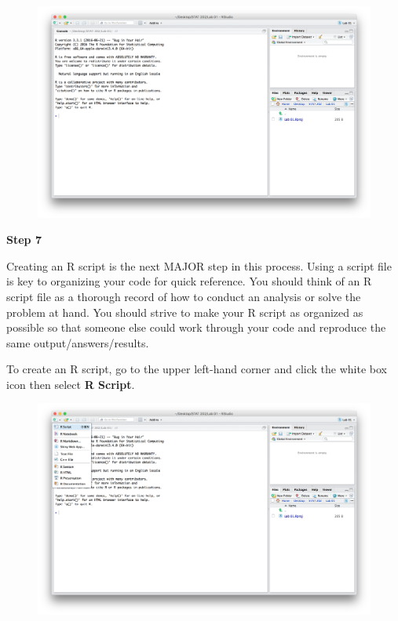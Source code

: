 \documentclass[]{book}
\theoremstyle{definition}
\theoremstyle{definition}
\theoremstyle{definition}
\theoremstyle{remark}
\begin{document}
\begin{figure}[htbp]
\centering
\includegraphics{./assets/images/01-05.png}
\caption{}
\end{figure}

\textbf{Step 7}

Creating an R script is the next MAJOR step in this process. Using a
script file is key to organizing your code for quick reference. You
should think of an R script file as a thorough record of how to conduct
an analysis or solve the problem at hand. You should strive to make your
R script as organized as possible so that someone else could work
through your code and reproduce the same output/answers/results.

To create an R script, go to the upper left-hand corner and click the
white box icon then select \textbf{R Script}.

\begin{figure}[htbp]
\centering
\includegraphics{./assets/images/01-06.png}
\caption{}
\end{figure}
\end{document}
